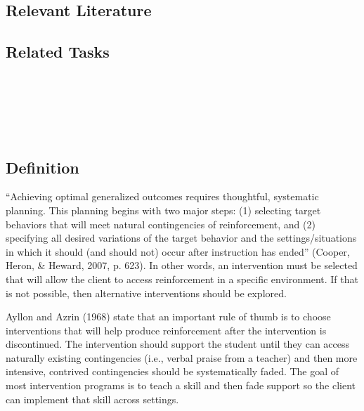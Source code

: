 \subsection{Relevant Literature}
\begin{refsection}
\nocite{cooper2007applied,
    lovaas1977autistic,
    newman2009reasonable,
    pryor1999don,
    ricciardi2006shaping,
    skinner1979shaping}
\printbibliography[heading=none]
\end{refsection}
%
\subsection{Related Tasks}
\fourdOne{}\\
\fourdFive{}\\
\fourdTwentyOne{}\\
\fourFKFourtyOne{}\\
%
\clearpage \section[\fourjSix{}]{\fourjSix{}%
              }
\subsection{Definition}
``Achieving optimal generalized outcomes requires thoughtful, systematic planning. This planning begins with two major steps: (1) selecting target behaviors that will meet natural contingencies of reinforcement, and (2) specifying all desired variations of the target behavior and the settings/situations in which it should (and should not) occur after instruction has ended'' (Cooper, Heron, \& Heward, 2007, p. 623). In other words, an intervention must be selected that will allow the client to access reinforcement in a specific environment. If that is not possible, then alternative interventions should be explored. 

Ayllon and Azrin (1968) state that an important rule of thumb is to choose interventions that will help produce reinforcement after the intervention is discontinued. The intervention should support the student until they can access naturally existing contingencies (i.e., verbal praise from a teacher) and then more intensive, contrived contingencies should be systematically faded. The goal of most intervention programs is to teach a skill and then fade support so the client can implement that skill across settings. 

